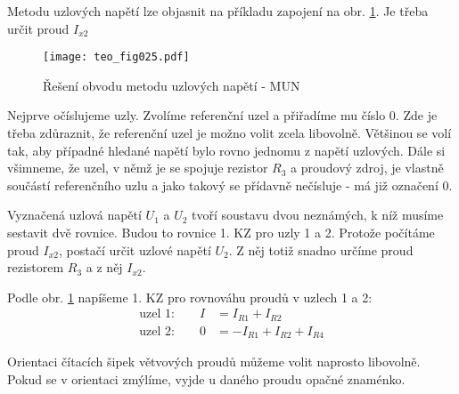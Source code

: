       Metodu uzlových napětí lze objasnit na příkladu zapojení na obr. \ref{teo:fig025}. Je
      třeba určit proud $I_{x2}$ 
      \begin{figure}[ht!]  %
        \centering
        \texttt{[image: teo\_fig025.pdf]}
        \caption{Řešení obvodu metodu uzlových napětí - MUN \cite[s.~62]{Biolek2004}}
        \label{teo:fig025}
      \end{figure}
      Nejprve očíslujeme uzly. Zvolíme referenční uzel a přiřadíme mu číslo 0. Zde je třeba  
      zdůraznit, že referenční uzel je možno volit zcela libovolně. Většinou se volí tak, aby 
      případné hledané napětí bylo rovno jednomu z napětí uzlových. Dále si všimneme, že uzel, v 
      němž je se spojuje rezistor $R_3$ a proudový zdroj, je vlastně součástí referenčního uzlu a 
      jako takový se přídavně nečísluje - má již označení \num{0}.
      
      Vyznačená uzlová napětí $U_1$ a $U_2$ tvoří soustavu dvou neznámých, k níž musíme sestavit 
      dvě rovnice. Budou to rovnice 1. KZ pro uzly 1 a 2. Protože počítáme proud $I_{x2}$, postačí 
      určit uzlové napětí $U_2$. Z něj totiž snadno určíme proud rezistorem $R_3$ a z něj $I_{x2}$.
      
      Podle obr. \ref{teo:fig025} napíšeme 1. KZ pro rovnováhu proudů v uzlech 1 a 2:
      \begin{align*}
        \text{uzel 1:} \qquad I &=  I_{R1} + I_{R2}            \\
        \text{uzel 2:} \qquad 0 &= -I_{R1} + I_{R2} + I_{R4}  
      \end{align*}
      
      Orientaci čítacích šipek větvových proudů můžeme volit naprosto libovolně. Pokud se v 
      orientaci zmýlíme, vyjde u daného proudu opačné znaménko.
      
